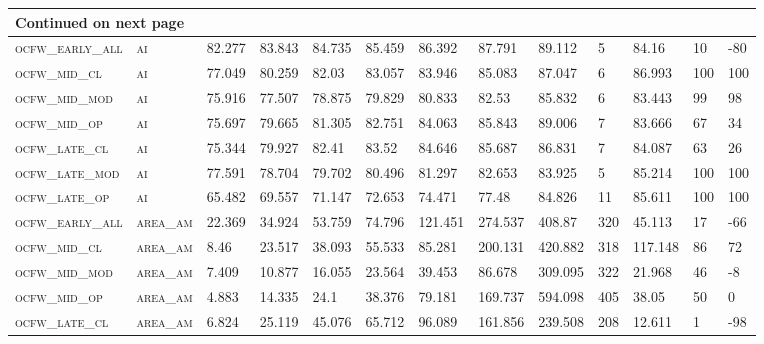 \begin{landscape}
\begin{center}
\begin{footnotesize}
\begin{longtable}{lllllllllllll}
\hline \multicolumn{13}{|l|}{{Continued on next page}} \\ \hline
\endfoot

\hline \hline
\endlastfoot

\textsc{ocfw\_early\_all} & \textsc{ai        }   & 82.277   & 83.843   & 84.735   & 85.459   & 86.392   & 87.791   & 89.112   & 5   & 84.16    & 10  & -80  \\
\textsc{ocfw\_mid\_cl   } & \textsc{ai        }   & 77.049   & 80.259   & 82.03    & 83.057   & 83.946   & 85.083   & 87.047   & 6   & 86.993   & 100 & 100  \\
\textsc{ocfw\_mid\_mod  } & \textsc{ai        }   & 75.916   & 77.507   & 78.875   & 79.829   & 80.833   & 82.53    & 85.832   & 6   & 83.443   & 99  & 98   \\
\textsc{ocfw\_mid\_op   } & \textsc{ai        }   & 75.697   & 79.665   & 81.305   & 82.751   & 84.063   & 85.843   & 89.006   & 7   & 83.666   & 67  & 34   \\
\textsc{ocfw\_late\_cl  } & \textsc{ai        }   & 75.344   & 79.927   & 82.41    & 83.52    & 84.646   & 85.687   & 86.831   & 7   & 84.087   & 63  & 26   \\
\textsc{ocfw\_late\_mod } & \textsc{ai        }   & 77.591   & 78.704   & 79.702   & 80.496   & 81.297   & 82.653   & 83.925   & 5   & 85.214   & 100 & 100  \\
\textsc{ocfw\_late\_op  } & \textsc{ai        }   & 65.482   & 69.557   & 71.147   & 72.653   & 74.471   & 77.48    & 84.826   & 11  & 85.611   & 100 & 100  \\
\textsc{ocfw\_early\_all} & \textsc{area\_am  }   & 22.369   & 34.924   & 53.759   & 74.796   & 121.451  & 274.537  & 408.87   & 320 & 45.113   & 17  & -66  \\
\textsc{ocfw\_mid\_cl   } & \textsc{area\_am  }   & 8.46     & 23.517   & 38.093   & 55.533   & 85.281   & 200.131  & 420.882  & 318 & 117.148  & 86  & 72   \\
\textsc{ocfw\_mid\_mod  } & \textsc{area\_am  }   & 7.409    & 10.877   & 16.055   & 23.564   & 39.453   & 86.678   & 309.095  & 322 & 21.968   & 46  & -8   \\
\textsc{ocfw\_mid\_op   } & \textsc{area\_am  }   & 4.883    & 14.335   & 24.1     & 38.376   & 79.181   & 169.737  & 594.098  & 405 & 38.05    & 50  & 0    \\
\textsc{ocfw\_late\_cl  } & \textsc{area\_am  }   & 6.824    & 25.119   & 45.076   & 65.712   & 96.089   & 161.856  & 239.508  & 208 & 12.611   & 1   & -98  \\

\end{longtable}
\end{footnotesize}
\end{center}
\end{landscape}
